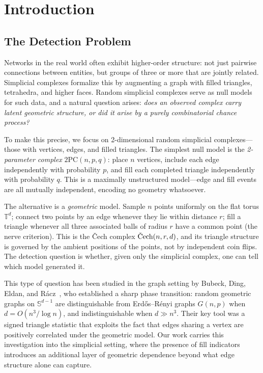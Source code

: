 \documentclass[reqno,12pt]{amsart}
\newcommand{\PC}{\mathrm{2PC}}
\newcommand{\Cech}{\ifmmode\text{\v{C}ech}\else\v{C}ech\fi}  %
\newcommand{\TT}{\mathbb{T}}         %
\newcommand{\Sph}{\mathbb{S}}
\theoremstyle{plain}
\theoremstyle{definition}
\theoremstyle{remark}
\begin{document}
\maketitle

\section{Introduction}

\subsection{The Detection Problem}

Networks in the real world often exhibit higher-order structure: not just pairwise connections
between entities, but groups of three or more that are jointly related. Simplicial complexes
formalize this by augmenting a graph with filled triangles, tetrahedra, and higher faces.
Random simplicial complexes serve as null models for such data, and a natural question arises:
\emph{does an observed complex carry latent geometric structure, or did it arise by a purely
combinatorial chance process?}

To make this precise, we focus on 2-dimensional random simplicial complexes---those with
vertices, edges, and filled triangles. The simplest null model is the
\emph{2-parameter complex} $\PC(n,p,q)$: place $n$ vertices, include each edge independently
with probability $p$, and fill each completed triangle independently with probability $q$.
This is a maximally unstructured model---edge and fill events are all mutually independent,
encoding no geometry whatsoever.

The alternative is a \emph{geometric} model. Sample $n$ points uniformly on the flat torus
$\TT^d$; connect two points by an edge whenever they lie within distance $r$; fill a triangle
whenever all three associated balls of radius $r$ have a common point (the nerve criterion).
This is the \v{C}ech complex $\Cech(n,r,d)$, and its triangle structure is governed by the
ambient positions of the points, not by independent coin flips. The detection question is
whether, given only the simplicial complex, one can tell which model generated it.

This type of question has been studied in the graph setting by Bubeck, Ding, Eldan, and
R\'acz~\cite{Bubeck2016}, who established a sharp phase transition: random geometric graphs
on $\Sph^{d-1}$ are distinguishable from Erd\H{o}s--R\'enyi graphs $G(n,p)$ when
$d = O(n^3/\log n)$, and indistinguishable when $d\gg n^3$. Their key tool was a signed
triangle statistic that exploits the fact that edges sharing a vertex are positively correlated
under the geometric model. Our work carries this investigation into the simplicial setting,
where the presence of fill indicators introduces an additional layer of geometric dependence
beyond what edge structure alone can capture.
\end{document}
